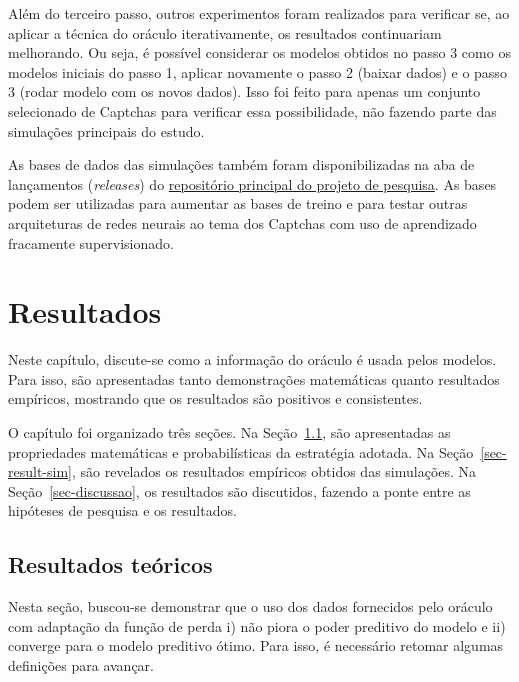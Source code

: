 \documentclass[12pt,twoside,brazilian]{book}
\begin{document}
Além do terceiro passo, outros experimentos foram realizados para
verificar se, ao aplicar a técnica do oráculo iterativamente, os
resultados continuariam melhorando. Ou seja, é possível considerar os
modelos obtidos no passo 3 como os modelos iniciais do passo 1, aplicar
novamente o passo 2 (baixar dados) e o passo 3 (rodar modelo com os
novos dados). Isso foi feito para apenas um conjunto selecionado de
Captchas para verificar essa possibilidade, não fazendo parte das
simulações principais do estudo.

As bases de dados das simulações também foram disponibilizadas na aba de
lançamentos (\emph{releases}) do
\href{https://github.com/jtrecenti/doutorado/releases}{repositório
principal do projeto de pesquisa}. As bases podem ser utilizadas para
aumentar as bases de treino e para testar outras arquiteturas de redes
neurais ao tema dos Captchas com uso de aprendizado fracamente
supervisionado.


\hypertarget{sec-results}{%
\chapter{Resultados}\label{sec-results}}

Neste capítulo, discute-se como a informação do oráculo é usada pelos
modelos. Para isso, são apresentadas tanto demonstrações matemáticas
quanto resultados empíricos, mostrando que os resultados são positivos e
consistentes.

O capítulo foi organizado três seções. Na Seção~\ref{sec-result-theory},
são apresentadas as propriedades matemáticas e probabilísticas da
estratégia adotada. Na Seção~\ref{sec-result-sim}, são revelados os
resultados empíricos obtidos das simulações. Na
Seção~\ref{sec-discussao}, os resultados são discutidos, fazendo a ponte
entre as hipóteses de pesquisa e os resultados.

\hypertarget{sec-result-theory}{%
\section{Resultados teóricos}\label{sec-result-theory}}

Nesta seção, buscou-se demonstrar que o uso dos dados fornecidos pelo
oráculo com adaptação da função de perda i) não piora o poder preditivo
do modelo e ii) converge para o modelo preditivo ótimo. Para isso, é
necessário retomar algumas definições para avançar.
\end{document}
